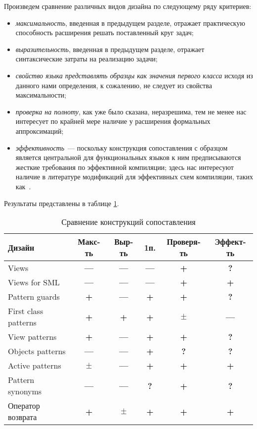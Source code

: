 Произведем сравнение различных видов дизайна по следующему ряду критериев:
\begin{itemize}
\item \emph{максимальность}, введенная в предыдущем разделе, отражает практическую способность расширения решать поставленный круг \mbox{задач};
\item \emph{выразительность}, введенная в предыдущем разделе, отражает синтаксические затраты на реализацию задачи;
\item \emph{свойство языка представлять образцы как значения первого \mbox{класса}}  исходя из данного нами определения, к сожалению, не следует из свойства максимальности;
\item \emph{проверка на полноту}, как уже было сказана, неразрешима, тем не менее нас интересует по крайней мере наличие у расширения формальных аппроксимаций;
\item \emph{эффективность}~--- поскольку конструкция сопоставления с образцом является центральной для функциональных языков к ним предписываются жесткие требования по эффективной компиляции; здесь нас интересуют наличие в литературе модификаций для эффективных схем компиляции, таких как~\cite{fessant2001optimizing, maranget2008decisiontrees, scott2000whendo}.
\end{itemize}

Результаты представлены в таблице \ref{tab:comparison}.

\begin{table}[H]
\centering
\begin{tabular}{l|c|c|c|c|c}
Дизайн               & Макс-ть        & Выр-ть     & 1п.          & Проверя-ть      & Эффект-ть      \\ \hline
Views                & \textbf{---}   & \textbf{---} & \textbf{---} & \textbf{+}      & \textbf{?}     \\
Views for SML        & \textbf{---}   & \textbf{---} & \textbf{---} & \textbf{+}      & \textbf{+}     \\
Pattern guards       & \textbf{+}     & \textbf{---} & \textbf{+}   & \textbf{+}      & \textbf{?}     \\
First class patterns & \textbf{+}     & \textbf{+}   & \textbf{+}   & \textbf{$\pm$}     & \textbf{---}  \\
View patterns        & \textbf{+}     & \textbf{---} & \textbf{+}   & \textbf{+}      & \textbf{?}     \\
Objects patterns     & \textbf{---}   & \textbf{---} & \textbf{+}   & \textbf{?}     & \textbf{?}     \\
Active patterns      & \textbf{$\pm$}  & \textbf{---} & \textbf{+}   & \textbf{+}      & \textbf{+}     \\
Pattern synonyms     & \textbf{---}   & \textbf{---} & \textbf{?}   & \textbf{+}      & \textbf{?}     \\
Оператор возврата    & \textbf{+}     & \textbf{$\pm$} & \textbf{+}  & \textbf{+}      & \textbf{+}     \\
\end{tabular}
\caption{\label{tab:comparison} Сравнение конструкций сопоставления}
\end{table}

